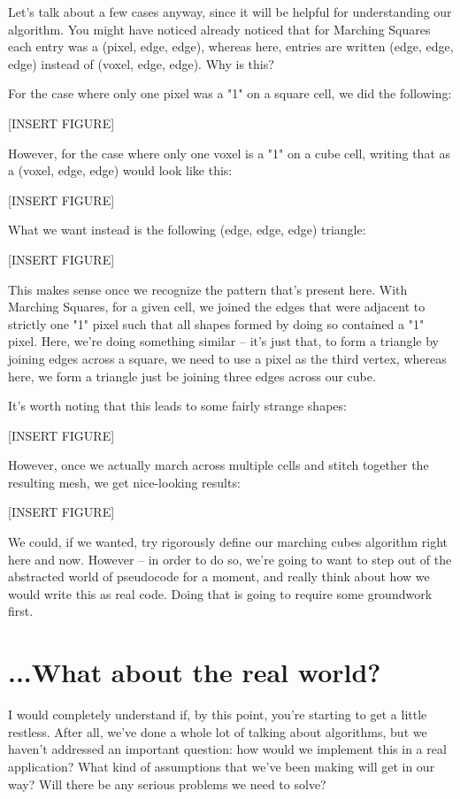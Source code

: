 \documentclass[12pt,twoside]{reedthesis}
\begin{document}
Let's talk about a few cases anyway, since it will be helpful for understanding our algorithm.
You might have noticed already noticed that for Marching Squares each entry was a (pixel, edge, edge), whereas here, entries are written (edge, edge, edge) instead of (voxel, edge, edge). Why is this?

For the case where only one pixel was a "1" on a square cell, we did the following:

[INSERT FIGURE]

However, for the case where only one voxel is a "1" on a cube cell, writing that as a (voxel, edge, edge) would look like this:

[INSERT FIGURE]

What we want instead is the following (edge, edge, edge) triangle:

[INSERT FIGURE]

This makes sense once we recognize the pattern that's present here. With Marching Squares, for a given cell, we joined the edges that were adjacent to strictly one "1" pixel such that all shapes formed by doing so contained a "1" pixel. Here, we're doing something similar -- it's just that, to form a triangle by joining edges across a square, we need to use a pixel as the third vertex, whereas here, we form a triangle just be joining three edges across our cube.

It's worth noting that this leads to some fairly strange shapes:

[INSERT FIGURE]

However, once we actually march across multiple cells and stitch together the resulting mesh, we get nice-looking results:

[INSERT FIGURE]

We could, if we wanted, try rigorously define our marching cubes algorithm right here and now. However -- in order to do so, we're going to want to step out of the abstracted world of pseudocode for a moment, and really think about how we would write this as real code. Doing that is going to require some groundwork first.

\section{...What about the real world?}

I would completely understand if, by this point, you're starting to get a little restless. After all, we've done a whole lot of talking about algorithms, but we haven't addressed an important question: how would we implement this in a real application? What kind of assumptions that we've been making will get in our way? Will there be any serious problems we need to solve?
\end{document}
